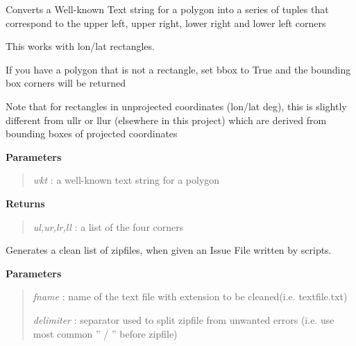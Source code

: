 \documentclass[letterpaper,10pt,english]{sphinxmanual}
\begin{document}
\begin{fulllineitems}
\label{code:Util.wktpoly2pts}
Converts a Well-known Text string for a polygon into a series of tuples that
correspond to the upper left, upper right, lower right and lower left corners

This works with lon/lat rectangles.

If you have a polygon that is not a rectangle, set bbox to True and the 
bounding box corners will be returned

Note that for rectangles in unprojected coordinates (lon/lat deg), this is 
slightly different from ullr or llur (elsewhere in this project) which are 
derived from bounding boxes of projected coordinates

\textbf{Parameters}
\begin{quote}

\emph{wkt}         : a well-known text string for a polygon
\end{quote}

\textbf{Returns}
\begin{quote}

\emph{ul,ur,lr,ll} : a list of the four corners
\end{quote}

\end{fulllineitems}


\begin{fulllineitems}
\label{code:Util.writeIssueFile}
Generates a clean list of zipfiles, when given an Issue File written by scripts.

\textbf{Parameters}
\begin{quote}

\emph{fname}     :   name of the text file with extension to be cleaned(i.e. textfile.txt)

\emph{delimiter} :   separator used to split zipfile from unwanted errors (i.e. use most common '' / '' before zipfile)
\end{quote}

\end{fulllineitems}
\end{document}

